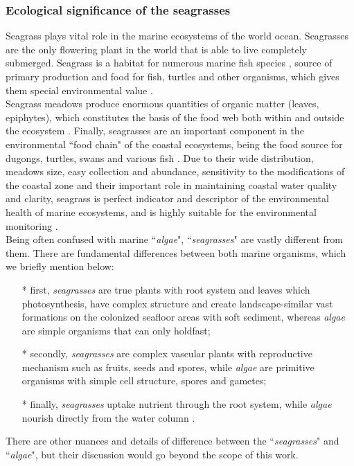 \documentclass[11pt]{article}
\begin{document}
\subsubsection{Ecological significance of the seagrasses}
Seagrass plays vital role in the marine ecosystems of the world ocean. 
Seagrasses are the only flowering plant in the world that is able to live completely submerged. Seagrass is a habitat for
numerous marine fish species \cite{Nagelkerken00}\label{Nagelkerken00}, source of primary production and food for
fish, turtles and other organisms, which gives them special environmental value \cite{Noralez10}\label{Noralez10}.\\
Seagrass meadows produce enormous quantities of organic matter (leaves, epiphytes), which
constitutes the basis of the food web both within and outside the ecosystem \cite{Gobert06}\label{Gobert06}.
Finally, seagrasses are an important component in the environmental ``food chain" of the coastal
ecosystems, being the food source for dugongs, turtles, swans and various fish \cite{Cappo95}\label{Cappo95}.
Due to their wide distribution, meadows size, easy collection and abundance, sensitivity to the
modifications of the coastal zone and their important role in maintaining coastal water quality
and clarity, seagrass is perfect indicator and descriptor of the environmental health of marine
ecosystems, and is highly suitable for the environmental monitoring \cite{Pergent-Martini05}\label{Pergent-Martini05}.\\
Being often confused with marine ``\textit{algae}", ``\textit{seagrasses}" are vastly different from them.
There are fundamental differences between both marine organisms, which we briefly mention below: 
\begin{itemize}
	\item[*] first, \textit{seagrasses} are true plants with root system and leaves which photosynthesis, have
complex structure and create landscape-similar vast formations on the colonized seafloor areas with
soft sediment, whereas \textit{algae} are simple organisms that can only holdfast; 
	\item[*] secondly, \textit{seagrasses} are complex vascular plants with reproductive mechanism such as fruits, seeds and spores, while \textit{algae} are primitive organisms with simple cell structure, spores and gametes; 
	\item[*] finally, \textit{seagrasses} uptake nutrient through the root system, while \textit{algae} nourish directly from the water column \cite{Dixon05}\label{Dixon05}. 
\end{itemize}
There are other nuances and details of difference between the ``\textit{seagrasses}" and ``\textit{algae}", but their discussion would go beyond the scope of this work.
\end{document}
